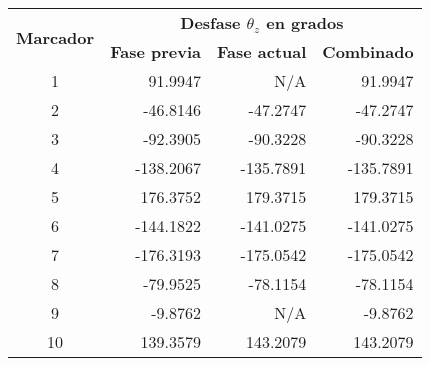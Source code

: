 \begin{table}[H]
	\centering
	\begin{tabular}{|c|rrr|}
		\hline
		\multirow{2}{*}{\textbf{Marcador}} & \multicolumn{3}{c|}{\textbf{Desfase   $\theta_z$ en grados}}                                                                            \\ \cline{2-4} 
		& \multicolumn{1}{c|}{\textbf{Fase previa}} & \multicolumn{1}{c|}{\textbf{Fase actual}} & \multicolumn{1}{c|}{\textbf{Combinado}} \\ \hline
		1                                  & \multicolumn{1}{r|}{91.9947}              & \multicolumn{1}{r|}{N/A}                  & 91.9947                                 \\ \hline
		2                                  & \multicolumn{1}{r|}{-46.8146}             & \multicolumn{1}{r|}{-47.2747}             & -47.2747                                \\ \hline
		3                                  & \multicolumn{1}{r|}{-92.3905}             & \multicolumn{1}{r|}{-90.3228}             & -90.3228                                \\ \hline
		4                                  & \multicolumn{1}{r|}{-138.2067}            & \multicolumn{1}{r|}{-135.7891}            & -135.7891                               \\ \hline
		5                                  & \multicolumn{1}{r|}{176.3752}             & \multicolumn{1}{r|}{179.3715}             & 179.3715                                \\ \hline
		6                                  & \multicolumn{1}{r|}{-144.1822}            & \multicolumn{1}{r|}{-141.0275}            & -141.0275                               \\ \hline
		7                                  & \multicolumn{1}{r|}{-176.3193}            & \multicolumn{1}{r|}{-175.0542}            & -175.0542                               \\ \hline
		8                                  & \multicolumn{1}{r|}{-79.9525}             & \multicolumn{1}{r|}{-78.1154}             & -78.1154                                \\ \hline
		9                                  & \multicolumn{1}{r|}{-9.8762}              & \multicolumn{1}{r|}{N/A}                  & -9.8762                                 \\ \hline
		10                                 & \multicolumn{1}{r|}{139.3579}             & \multicolumn{1}{r|}{143.2079}             & 143.2079                                \\ \hline

\end{tabular}
\end{table}
